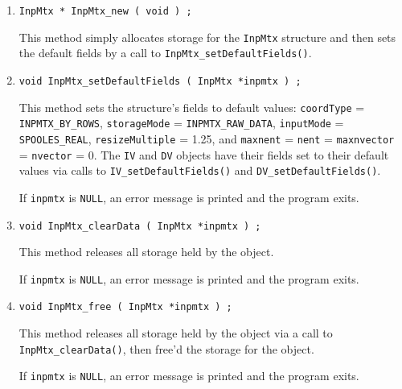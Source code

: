 \begin{enumerate}
\item
\begin{verbatim}
InpMtx * InpMtx_new ( void ) ;
\end{verbatim}
This method simply allocates storage for the {\tt InpMtx} structure 
and then sets the default fields by a call to 
{\tt InpMtx\_setDefaultFields()}.
\item
\begin{verbatim}
void InpMtx_setDefaultFields ( InpMtx *inpmtx ) ;
\end{verbatim}
This method sets the structure's fields to default values:
{\tt coordType} = {\tt INPMTX\_BY\_ROWS},
{\tt storageMode} = {\tt INPMTX\_RAW\_DATA},
{\tt inputMode} = {\tt SPOOLES\_REAL}, 
{\tt resizeMultiple} = 1.25, and
{\tt maxnent} = {\tt nent} =
{\tt maxnvector} = {\tt nvector} = 0.
The {\tt IV} and {\tt DV} objects have their fields set to their
default values via calls to {\tt IV\_setDefaultFields()} and
{\tt DV\_setDefaultFields()}.
\par {}
If {\tt inpmtx} is {\tt NULL},
an error message is printed and the program exits.
\item
\begin{verbatim}
void InpMtx_clearData ( InpMtx *inpmtx ) ;
\end{verbatim}
This method releases all storage held by the object.
\par {}
If {\tt inpmtx} is {\tt NULL},
an error message is printed and the program exits.
\item
\begin{verbatim}
void InpMtx_free ( InpMtx *inpmtx ) ;
\end{verbatim}
This method releases all storage held by the object via a call to
{\tt InpMtx\_clearData()}, then free'd the storage for the
object.
\par {}
If {\tt inpmtx} is {\tt NULL},
an error message is printed and the program exits.
\end{enumerate}
\par
